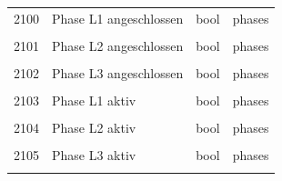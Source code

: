 \documentclass[a4paper,10pt]{article}
\newcommand{\tdesc}[1]{\multicolumn{3}{l}{\footnotesize #1}}
\begin{document}
\begin{tabularx}{\textwidth}{rXll}
2100          & Phase L1 angeschlossen                  & bool         & phases                                                 \\
              & \tdesc{}                                                                                                        \\ \cmidrule{2-4}
2101          & Phase L2 angeschlossen                  & bool         & phases                                                 \\
              & \tdesc{}                                                                                                        \\ \cmidrule{2-4}
2102          & Phase L3 angeschlossen                  & bool         & phases                                                 \\
              & \tdesc{}                                                                                                        \\ \cmidrule{2-4}
2103          & Phase L1 aktiv                          & bool         & phases                                                 \\
              & \tdesc{}                                                                                                        \\ \cmidrule{2-4}
2104          & Phase L2 aktiv                          & bool         & phases                                                 \\
              & \tdesc{}                                                                                                        \\ \cmidrule{2-4}
2105          & Phase L3 aktiv                          & bool         & phases                                                 \\
              & \tdesc{}                                                                                                        \\ \bottomrule
   \end{tabularx}

\newpage
\end{document}
